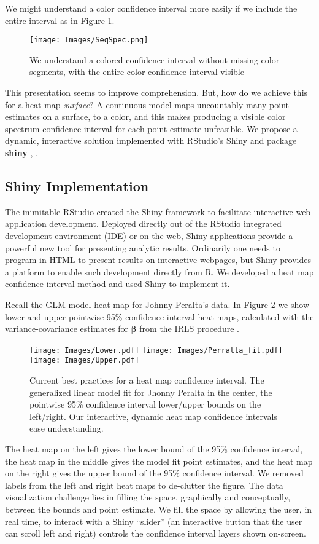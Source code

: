 We might understand a color confidence interval more easily if we include the entire interval as in Figure \ref{fig:specint}.
  \begin{figure}[H]
  \centering
	\texttt{[image: Images/SeqSpec.png]}
	\caption{We understand a colored confidence interval without missing color segments, with the entire color confidence interval visible}
	\label{fig:specint}
	\end{figure}
This presentation seems to improve comprehension. But, how do we achieve this for a heat map {\it surface}? A continuous model maps uncountably many point estimates on a surface, to a color, and this makes producing a visible color spectrum confidence interval for each point estimate unfeasible. We propose a dynamic, interactive solution implemented with RStudio's Shiny and package {\bf shiny} \citep{Shiny}, \citep{RStudio}.

\subsection{Shiny Implementation}
The inimitable RStudio created the Shiny framework to facilitate interactive web application development. Deployed directly out of the RStudio integrated development environment (IDE) \citep{IDE} or on the web, Shiny applications provide a powerful new tool for presenting analytic results. Ordinarily one needs to program in HTML to present results on interactive webpages, but Shiny provides a platform to enable such development directly from R. We developed a heat map confidence interval method and used Shiny to implement it.

Recall the GLM model heat map for Johnny Peralta's data. In Figure \ref{fig:LPU} we show lower and upper pointwise 95\% confidence interval heat maps, calculated with the variance-covariance estimates for $\pmb{\beta}$ from the IRLS procedure \citep{Myers2012}.
  \begin{figure}[H]
	\centering
	\texttt{[image: Images/Lower.pdf]}
	\texttt{[image: Images/Perralta\_fit.pdf]}
	\texttt{[image: Images/Upper.pdf]}
	\caption{Current best practices for a heat map confidence interval. The generalized linear model fit for Jhonny Peralta in the center, the pointwise 95\% confidence interval lower/upper bounds on the left/right. Our interactive, dynamic heat map confidence intervals ease understanding.}
	\label{fig:LPU}
	\end{figure}
The heat map on the left gives the lower bound of the 95\% confidence interval, the heat map in the middle gives the model fit point estimates, and the heat map on the right gives the upper bound of the 95\% confidence interval. We removed labels from the left and right heat maps to de-clutter the figure. The data visualization challenge lies in filling the space, graphically and conceptually, between the bounds and point estimate. We fill the space by allowing the user, in real time, to interact with a Shiny ``slider'' (an interactive button that the user can scroll left and right) controls the confidence interval layers shown on-screen. 

